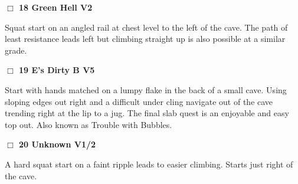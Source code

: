 \begin{multicols}{2}
\needspace{2em}
\label{rt:Green Hell}
\colorbox{green!20}{
\parbox{0.95\linewidth}{
\hspace{-1ex}\textbf{$\Box$
18 Green Hell V2  
}}}
\begin{adjustwidth}{1.3em}{}			

Squat start on an angled rail at chest level to the left of the cave. The path of least resistance leads left but climbing straight up is also possible at a similar grade.
\end{adjustwidth}




\needspace{2em}
\label{rt:E's Dirty B}
\colorbox{RoyalBlue!20}{
\parbox{0.95\linewidth}{
\hspace{-1ex}\textbf{$\Box$
19 E's Dirty B V5  
}}}
\begin{adjustwidth}{1.3em}{}			

Start with hands matched on a lumpy flake in the back of a small cave. Using sloping edges out right and a difficult under cling navigate out of the cave trending right at the lip to a jug. The final slab quest is an enjoyable and easy top out. Also known as Trouble with Bubbles.
\end{adjustwidth}




\needspace{2em}
\label{rt:Unknown on E's Dirty B}
\colorbox{green!20}{
\parbox{0.95\linewidth}{
\hspace{-1ex}\textbf{$\Box$
20 Unknown V1/2  
}}}
\begin{adjustwidth}{1.3em}{}			

A hard squat start on a faint ripple leads to easier climbing. Starts just right of the cave.
\end{adjustwidth}






	\end{multicols}


